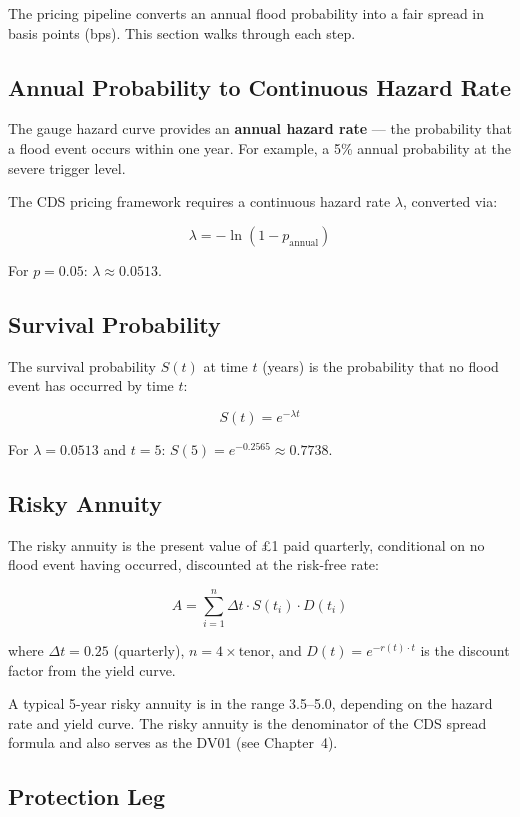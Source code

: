 \documentclass[11pt,a4paper]{article}
\begin{document}
The pricing pipeline converts an annual flood probability into a fair
spread in basis points (bps).  This section walks through each step.

\subsection{Annual Probability to Continuous Hazard Rate}

The gauge hazard curve provides an \textbf{annual hazard rate} --- the
probability that a flood event occurs within one year.  For example, a
5\% annual probability at the severe trigger level.

The CDS pricing framework requires a continuous hazard rate $\lambda$,
converted via:

\[
  \lambda = -\ln(1 - p_{\mathrm{annual}})
\]

\noindent For $p = 0.05$: $\lambda \approx 0.0513$.

\subsection{Survival Probability}

The survival probability $S(t)$ at time $t$ (years) is the probability
that no flood event has occurred by time $t$:

\[
  S(t) = e^{-\lambda t}
\]

\noindent For $\lambda = 0.0513$ and $t = 5$: $S(5) = e^{-0.2565} \approx 0.7738$.

\subsection{Risky Annuity}

The risky annuity is the present value of \pounds1 paid quarterly, conditional
on no flood event having occurred, discounted at the risk-free rate:

\[
  A = \sum_{i=1}^{n} \Delta t \cdot S(t_i) \cdot D(t_i)
\]

\noindent where $\Delta t = 0.25$ (quarterly), $n = 4 \times \text{tenor}$,
and $D(t) = e^{-r(t) \cdot t}$ is the discount factor from the yield curve.

A typical 5-year risky annuity is in the range 3.5--5.0, depending on the
hazard rate and yield curve.  The risky annuity is the denominator of the
CDS spread formula and also serves as the DV01 (see Chapter~4).

\subsection{Protection Leg}
\end{document}
